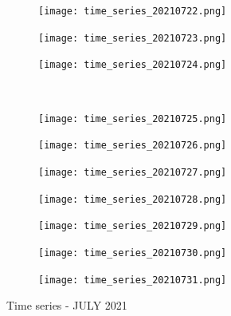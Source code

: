 \documentclass[10pt]{article}
\begin{document}
\begin{figure}[!h]
\begin{subfigure}[b]{0.166\linewidth}
        \centering
        \texttt{[image: time\_series\_20210722.png]}
    \end{subfigure}%
    \begin{subfigure}[b]{0.166\linewidth}
        \centering
        \texttt{[image: time\_series\_20210723.png]}
    \end{subfigure}%
    \begin{subfigure}[b]{0.166\linewidth}
        \centering
        \texttt{[image: time\_series\_20210724.png]}
    \end{subfigure}
    \\
    \begin{subfigure}[b]{0.166\linewidth}
        \centering
        \texttt{[image: time\_series\_20210725.png]}
    \end{subfigure}%
    \begin{subfigure}[b]{0.166\linewidth}
        \centering
        \texttt{[image: time\_series\_20210726.png]}
    \end{subfigure}%
        \begin{subfigure}[b]{0.166\linewidth}
        \centering
        \texttt{[image: time\_series\_20210727.png]}
    \end{subfigure}%
    \begin{subfigure}[b]{0.166\linewidth}
        \centering
        \texttt{[image: time\_series\_20210728.png]}
    \end{subfigure}%
    \begin{subfigure}[b]{0.166\linewidth}
        \centering
        \texttt{[image: time\_series\_20210729.png]}
    \end{subfigure}%
    \begin{subfigure}[b]{0.166\linewidth}
        \centering
        \texttt{[image: time\_series\_20210730.png]}
    \end{subfigure}%
    \begin{subfigure}[b]{0.166\linewidth}
        \centering
        \texttt{[image: time\_series\_20210731.png]}
    \end{subfigure}
     \caption{Time series - JULY 2021}
\label{fig:bands}
\end{figure}
\end{document}
